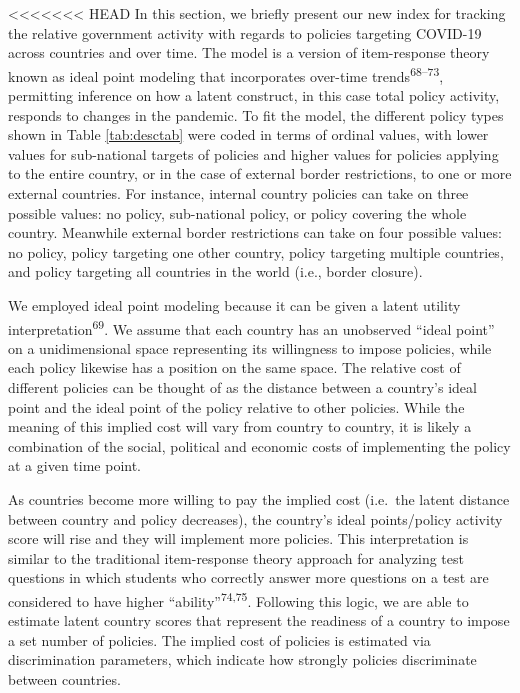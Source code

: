 \documentclass[]{article}
\begin{document}
<<<<<<< HEAD
In this section, we briefly present our new index for tracking the relative government activity with regards to policies targeting COVID-19 across countries and over time. The model is a version of item-response theory known as ideal point modeling that incorporates over-time trends\textsuperscript{68--73}, permitting inference on how a latent construct, in this case total policy activity, responds to changes in the pandemic. To fit the model, the different policy types shown in Table \ref{tab:desctab} were coded in terms of ordinal values, with lower values for sub-national targets of policies and higher values for policies applying to the entire country, or in the case of external border restrictions, to one or more external countries. For instance, internal country policies can take on three possible values: no policy, sub-national policy, or policy covering the whole country. Meanwhile external border restrictions can take on four possible values: no policy, policy targeting one other country, policy targeting multiple countries, and policy targeting all countries in the world (i.e., border closure).

We employed ideal point modeling because it can be given a latent utility interpretation\textsuperscript{69}. We assume that each country has an unobserved ``ideal point'' on a unidimensional space representing its willingness to impose policies, while each policy likewise has a position on the same space. The relative cost of different policies can be thought of as the distance between a country's ideal point and the ideal point of the policy relative to other policies. While the meaning of this implied cost will vary from country to country, it is likely a combination of the social, political and economic costs of implementing the policy at a given time point.

As countries become more willing to pay the implied cost (i.e.~the latent distance between country and policy decreases), the country's ideal points/policy activity score will rise and they will implement more policies. This interpretation is similar to the traditional item-response theory approach for analyzing test questions in which students who correctly answer more questions on a test are considered to have higher ``ability''\textsuperscript{74,75}. Following this logic, we are able to estimate latent country scores that represent the readiness of a country to impose a set number of policies. The implied cost of policies is estimated via discrimination parameters, which indicate how strongly policies discriminate between countries.
\end{document}
